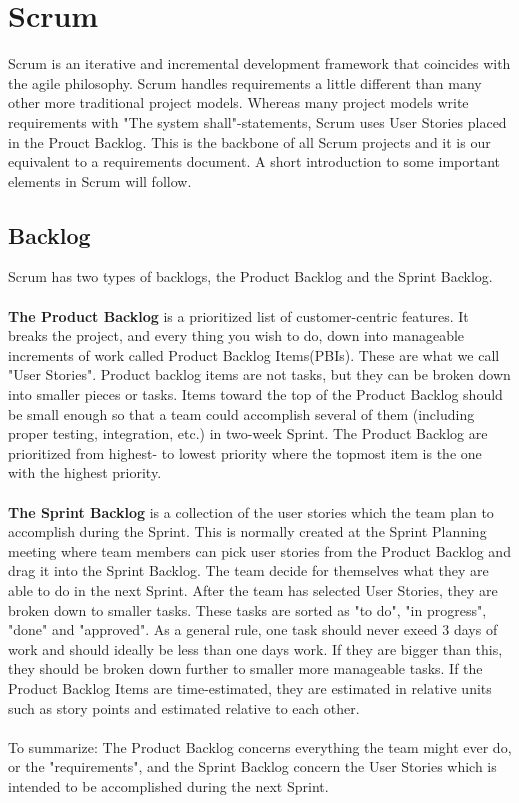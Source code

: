 \section{Scrum}
Scrum is an iterative and incremental development framework that coincides with the agile philosophy. Scrum handles requirements a little different than many other more traditional project models. Whereas many project models write requirements with "The system shall"-statements, Scrum uses User Stories placed in the Prouct Backlog. This is the backbone of all Scrum projects and it is our equivalent to a requirements document. A short introduction to some important elements in Scrum will follow. 


\subsection{Backlog}
Scrum has two types of backlogs, the Product Backlog and the Sprint Backlog.
\\ \\ 
\textbf{The Product Backlog} is a prioritized list of customer-centric features. It breaks the project, and every thing you wish to do, down into manageable increments of work called Product Backlog Items(PBIs). These are what we call "User Stories". Product backlog items are not tasks, but they can be broken down into smaller pieces or tasks. Items toward the top of the Product Backlog should be small enough so that a team could accomplish several of them (including proper testing, integration, etc.) in two-week Sprint. The Product Backlog are prioritized from highest- to lowest priority where the topmost item is the one with the highest priority.   
\\ \\ 
\textbf{The Sprint Backlog} is a collection of the user stories which the team plan to accomplish during the Sprint. This is normally created at the Sprint Planning meeting where team members can pick user stories from the Product Backlog and drag it into the Sprint Backlog. The team decide for themselves what they are able to do in the next Sprint. After the team has selected User Stories, they are broken down to smaller tasks. These tasks are sorted as "to do", "in progress", "done" and "approved". As a general rule, one task should never exeed 3 days of work and should ideally be less than one days work. If they are bigger than this, they should be broken down further to smaller more manageable tasks. If the Product Backlog Items are time-estimated, they are estimated in relative units such as story points and estimated relative to each other.
\\ \\ 
To summarize: The Product Backlog concerns everything the team might ever do, or the "requirements", and the Sprint Backlog concern the User Stories which is intended to be accomplished during the next Sprint.  
  
